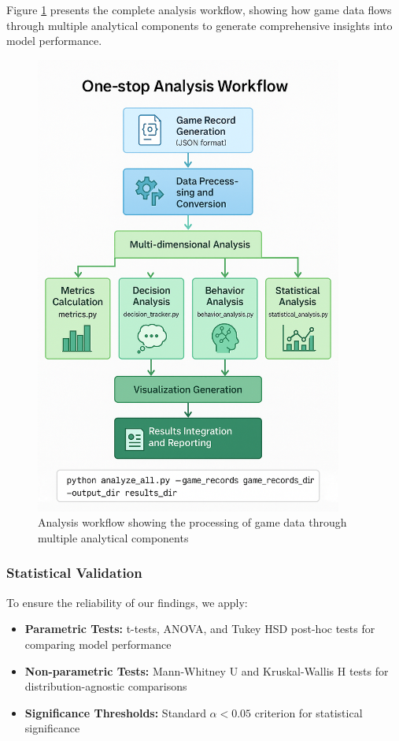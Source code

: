 \documentclass{article}
\begin{document}
Figure \ref{fig:analysis_workflow} presents the complete analysis workflow, showing how game data flows through multiple analytical components to generate comprehensive insights into model performance.

\begin{figure}[H]
    \centering
    \includegraphics[width=0.9\textwidth]{figures/analysis_flow.png}
    \caption{Analysis workflow showing the processing of game data through multiple analytical components}
    \label{fig:analysis_workflow}
\end{figure}

\subsubsection{Statistical Validation}
To ensure the reliability of our findings, we apply:
\begin{itemize}
    \item \textbf{Parametric Tests:} t-tests, ANOVA, and Tukey HSD post-hoc tests for comparing model performance
    \item \textbf{Non-parametric Tests:} Mann-Whitney U and Kruskal-Wallis H tests for distribution-agnostic comparisons
    \item \textbf{Significance Thresholds:} Standard $\alpha < 0.05$ criterion for statistical significance
\end{itemize}
\end{document}
